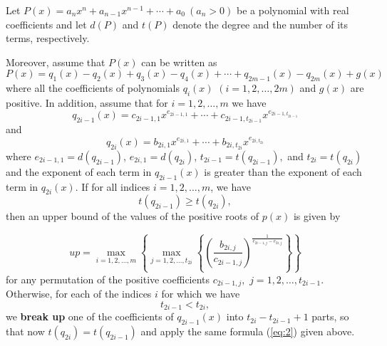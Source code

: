 \documentclass[10pt,a4paper]{article}
\begin{document}
\begin{theorem} \label{thm:qup}

  Let $P(x)=a_nx^n+a_{n-1}x^{n-1}+\cdots+a_0\ (a_n>0)$ be a polynomial with real coefficients and let $d(P)$ and $t(P)$ denote the degree and the number of its terms, respectively.

  Moreover, assume that $P(x)$ can be written as\begin{equation}
	P(x)=q_1(x)-q_2(x)+q_3(x)-q_4(x)+\cdots +q_{2m-1}(x)-q_{2m}(x)+g(x)
	\label{eq:1}
  \end{equation}
  where all the coefficients of polynomials $q_i(x)$ $(i=1,2,\ldots,2m)$ and $g(x)$ are positive. In addition,
  assume that for $i=1,2,\ldots,m$ we have
  \begin{equation*}
	q_{2i-1}(x)=c_{2i-1,1}x^{e_{2i-1,1}}+\cdots+c_{2i-1,t_{2i-1}}x^{e_{2i-1,t_{2i-1}}}
  \end{equation*}
  and
  \begin{equation*}
	q_{2i}(x)=b_{2i,1}x^{e_{2i,1}}+\cdots+b_{2i,t_{2i}}x^{e_{2i,t_{2i}}}
  \end{equation*}
  where $e_{2i-1,1}=d(q_{2i-1})$, $e_{2i,1}=d(q_{2i})$, $t_{2i-1}=t(q_{2i-1}),$ and $t_{2i}=t(q_{2i})$   and the exponent of each term in $q_{2i-1}(x)$ is greater than the exponent of each term in $q_{2i}(x)$. If for all indices $i=1,2,\ldots,m$, we have
  \begin{equation*}
	t(q_{2i-1})\ge t(q_{2i}),
  \end{equation*}
  then an upper bound of the values of the positive roots of $p(x)$ is given by

  \begin{equation}\label{eq:2}
	up= \max_{i=1,2,\ldots,m}\left\{ \max_{j=1,2,\ldots,t_{2i}}\left\{ \left( \frac{b_{2i,j}}{c_{2i-1,j}} \right)^{\frac{1}{e_{2i-1,j}- e_{2i,j} } } \right\}  \right\}
  \end{equation}
  for any permutation of the positive coefficients $c_{2i-1,j}, $ $j=1,2,\ldots,t_{2i-1}$.
  Otherwise, for each of the indices $i$ for which we have
  \begin{equation*}
	t_{2i-1}<t_{2i},
  \end{equation*}
  we {\bf break up} one of the coefficients of $q_{2i-1}(x)$ into $t_{2i}-t_{2i-1} +1$ parts, so that now $t(q_{2i} ) = t(q_{2i-1})$ and apply the same formula (\ref{eq:2}) given above.


\end{theorem}
\end{document}
